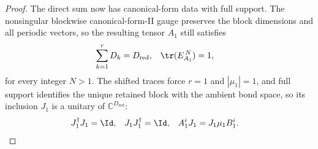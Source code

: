 \begin{proof}
    The direct sum now has canonical-form data with full support.
    The nonsingular blockwise canonical-form-II gauge preserves the
    block dimensions and all periodic vectors, so the resulting tensor $A_1$
    still satisfies
    \begin{align}
        \sum_{k=1}^{r}D_k & =D_{\mathrm{red}},
                          & \tr(E_{A_1}^{\,N}) & =1,
    \end{align}
    for every integer $N>1$.
    The shifted traces force $r=1$ and $\left|\mu_1\right|=1$, and full
    support identifies the unique retained block with the ambient bond space,
    so its inclusion $J_1$ is a unitary of $\mathbb C^{D_{\mathrm{red}}}$:
    \begin{align}
        J_1^\dagger J_1 & =\Id,
                        & J_1J_1^\dagger & =\Id,
                        & A_1^iJ_1       & =J_1\mu_1B_1^i.
    \end{align}


\end{proof}
